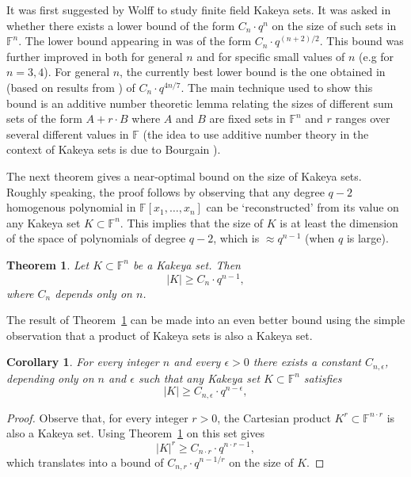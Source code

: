 \documentclass[12pt]{article}
\newtheorem{cor}[thm]{Corollary}
\newtheorem{THM}{Theorem}
\def\F{{\mathbb{F}}}
\newcommand{\eps}{\epsilon}
\begin{document}
It was first suggested by Wolff \cite{Wolff99} to study finite
field Kakeya sets. It was asked in \cite{Wolff99} whether there
exists a lower bound of the form $C_n \cdot q^n$ on the size of
such sets in $\F^n$. The lower bound appearing in \cite{Wolff99}
was of the form $C_n \cdot q^{(n+2)/2}$. This bound was further
improved in \cite{Rogers01,BKT04,MT04,Tao08} both for general $n$
and for specific small values of $n$  (e.g for $n=3,4$). For
general $n$, the currently best lower bound is the one obtained in
\cite{Rogers01,MT04} (based on results from \cite{KT99}) of $C_n
\cdot q^{4n/7}$. The main technique used to show this bound is an
additive number theoretic lemma relating the sizes of different
sum sets of the form $A + r \cdot B$ where $A$ and $B$ are fixed
sets in $\F^n$ and $r$ ranges over several different values in
$\F$ (the idea to use additive number theory in the context of
Kakeya sets is due to Bourgain \cite{Bou99}).

The next theorem gives a near-optimal bound on the size of Kakeya
sets. Roughly speaking, the proof follows by observing that any
degree $q-2$ homogenous polynomial in $\F[x_1,\ldots,x_n]$ can be
`reconstructed' from its value on any Kakeya set $K \subset \F^n$.
This implies that the size of $K$ is at least the dimension of the
space of polynomials of degree $q-2$, which is $\approx q^{n-1}$
(when $q$ is large).
\begin{THM}\label{thm-Kakeya}
Let $K \subset \F^n$ be a Kakeya set. Then
\[ |K| \geq C_n \cdot q^{n-1}, \]
where $C_n$ depends only on $n$.
\end{THM}
The result of Theorem~\ref{thm-Kakeya} can be made into an even
better bound using the simple observation that a product of Kakeya
sets is also a Kakeya set.
\begin{cor}\label{cor-Kakeya}
For every integer $n$ and every $\eps> 0$ there exists a constant
$C_{n,\eps}$, depending only on $n$ and $\eps$ such that any
Kakeya set $K \subset \F^n$ satisfies
\[ |K| \geq C_{n,\eps} \cdot q^{n-\eps}, \]
\end{cor}
\begin{proof}
Observe that, for every integer $r>0$, the Cartesian product $K^r
\subset \F^{n\cdot r}$ is also a Kakeya set. Using
Theorem~\ref{thm-Kakeya} on this set gives $$|K|^r \geq C_{n\cdot
r} \cdot q^{n\cdot r - 1},$$ which translates into a bound of
$C_{n,r} \cdot q^{n - 1/r}$ on the size of $K$.
\end{proof}
\end{document}

